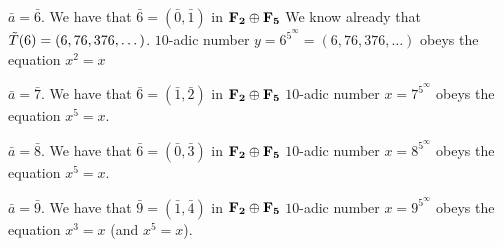 \m
  $\bar a=\bar 6$. We have that   $\bar 6=(\bar 0,\bar 1)$ in $\bf F_2\oplus F_{5}$
We know already  that $\tilde T(6)=(6,76,376,\dots)$.
   $10$-adic number $y=6^{5^\infty}=(6,76,376,\dots)$
    obeys the equation $x^2=x$

\m

$\bar a=\bar 7$. We have that   $\bar 6=(\bar 1,\bar 2)$ in $\bf F_2\oplus F_{5}$
    $10$-adic number $x=7^{5^\infty}$ obeys the equation $x^5=x$.


\m

$\bar a=\bar 8$. We have that   $\bar 6=(\bar 0,\bar 3)$ in $\bf F_2\oplus F_{5}$
    $10$-adic number $x=8^{5^\infty}$ obeys the equation $x^5=x$.


\m

$\bar a=\bar 9$. We have that   $\bar 9=(\bar 1,\bar 4)$ in $\bf F_2\oplus F_{5}$
    $10$-adic number $x=9^{5^\infty}$ obeys the equation $x^3=x$ (and $x^5=x$).





\m


  \bye
